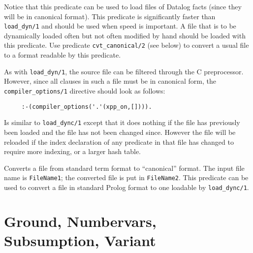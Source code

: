 \begin{description}
    Notice that this predicate can be used to load files of Datalog facts
    (since they will be in canonical format).  This predicate is
    significantly faster than {\tt load\_dyn/1} and should be used when
    speed is important.  A file that is to be dynamically loaded often but
    not often modified by hand should be loaded with this predicate.  Use
    predicate {\tt cvt\_canonical/2} (see below) to convert a usual file
    to a format readable by this predicate.

    As with \verb|load_dyn/1|, the source file can be filtered through the C
    preprocessor. However, since all clauses in such a file must be in
    canonical form, the \verb|compiler_options/1| directive should look as
    follows:
    \begin{verbatim}
     :-(compiler_options('.'(xpp_on,[]))).      
    \end{verbatim}

    Is similar to {\tt load\_dync/1} except that it does nothing if the
    file has previously been loaded and the file has not been changed
    since.  However the file will be reloaded if the index declaration of
    any predicate in that file has changed to require more indexing, or a
    larger hash table.

    Converts a file from standard term format to ``canonical'' format.
    The input file name is {\tt FileName1}; the converted file is put in
    {\tt FileName2}.  This predicate can be used to convert a file in
    standard Prolog format to one loadable by {\tt load\_dync/1}.
\end{description}



\section{Ground, Numbervars, Subsumption, Variant} \label{NumberVars}

